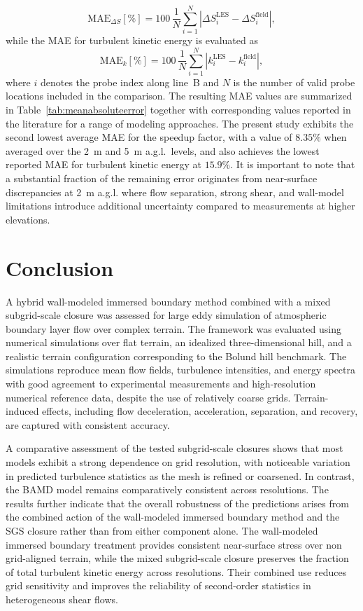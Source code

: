 \documentclass[%
superscriptaddress,
 amsmath,amssymb,
pra,
showkeys,
]{revtex4-2}
\begin{document}
\[
\mathrm{MAE}_{\Delta S}[\%]
= 100\,\frac{1}{N}\sum_{i=1}^{N}
\left|\Delta S_i^{\mathrm{LES}}-\Delta S_i^{\mathrm{field}}\right|,
\]
while the MAE for turbulent kinetic energy is evaluated as
\[
\mathrm{MAE}_{k}[\%]
= 100\,\frac{1}{N}\sum_{i=1}^{N}
\left|k_i^{\mathrm{LES}}-k_i^{\mathrm{field}}\right|,
\]
where \(i\) denotes the probe index along line~B and \(N\) is the number of valid probe locations included in the comparison. The resulting MAE values are summarized in Table~\ref{tab:meanabsoluteerror} together with corresponding values reported in the literature for a range of modeling approaches. The present study exhibits the second lowest average MAE for the speedup factor, with a value of \(8.35\%\) when averaged over the 2~m and 5~m a.g.l.\ levels, and also achieves the lowest reported MAE for turbulent kinetic energy at \(15.9\%\). It is important to note that a substantial fraction of the remaining error originates from near-surface discrepancies at 2~m a.g.l. where flow separation, strong shear, and wall-model limitations introduce additional uncertainty compared to measurements at higher elevations.

\section{\label{sec:conclusion}Conclusion}

A hybrid wall-modeled immersed boundary method combined with a mixed subgrid-scale closure was assessed for large eddy simulation of atmospheric boundary layer flow over complex terrain. The framework was evaluated using numerical simulations over flat terrain, an idealized three-dimensional hill, and a realistic terrain configuration corresponding to the Bolund hill benchmark. The simulations reproduce mean flow fields, turbulence intensities, and energy spectra with good agreement to experimental measurements and high-resolution numerical reference data, despite the use of relatively coarse grids. Terrain-induced effects, including flow deceleration, acceleration, separation, and recovery, are captured with consistent accuracy.

A comparative assessment of the tested subgrid-scale closures shows that most models exhibit a strong dependence on grid resolution, with noticeable variation in predicted turbulence statistics as the mesh is refined or coarsened. In contrast, the BAMD model remains comparatively consistent across resolutions. The results further indicate that the overall robustness of the predictions arises from the combined action of the wall-modeled immersed boundary method and the SGS closure rather than from either component alone. The wall-modeled immersed boundary treatment provides consistent near-surface stress over non grid-aligned terrain, while the mixed subgrid-scale closure preserves the fraction of total turbulent kinetic energy across resolutions. Their combined use reduces grid sensitivity and improves the reliability of second-order statistics in heterogeneous shear flows.
\end{document}
